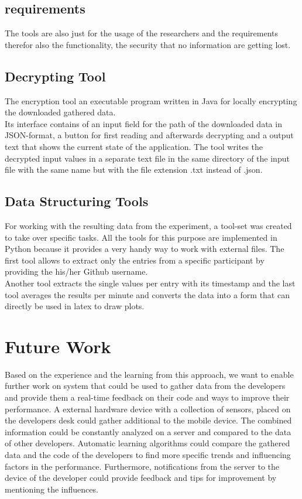 \subsection{requirements}
The tools are also just for the usage of the researchers and the requirements therefor also the functionality, the security that no information are getting lost.

\subsection{Decrypting Tool}
The encryption tool an executable program written in Java for locally encrypting the downloaded gathered data.\\
Its interface contains of an input field for the path of the downloaded data in JSON-format, a button for first reading and afterwards decrypting and a output text that shows the current state of the application. The tool writes the decrypted input values in a separate text file in the same directory of the input file with the same name but with the file extension .txt instead of .json. 

\subsection{Data Structuring Tools}
For working with the resulting data from the experiment, a tool-set was created to take over specific tasks. All the tools for this purpose are implemented in Python because it provides a very handy way to work with external files. 
The first tool allows to extract only the entries from a specific participant by providing the his/her Github username.\\
Another tool extracts the single values per entry with its timestamp and the last tool averages the results per minute and converts the data into a form that can directly be used in latex to draw plots.

\section{Future Work}
Based on the experience and the learning from this approach, we want to enable further work on system that could be used to gather data from the developers and provide them a real-time feedback on their code and ways to improve their performance.
A external hardware device with a collection of sensors, placed on the developers desk could gather additional to the mobile device. 
The combined information could be constantly analyzed on a server and compared to the data of other developers. Automatic learning algorithms could compare the gathered data and the code of the developers to find more specific trends and influencing factors in the performance. 
Furthermore, notifications from the server to the device of the developer could provide feedback and tips for improvement by mentioning the influences. 

